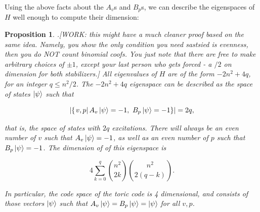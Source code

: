 \documentclass{article}
\newtheorem{proposition}{Proposition}[section]
\theoremstyle{definition}
\numberwithin{figure}{section}
\begin{document}
Using the above facts about the $A_v$s and $B_p$s, we can describe the eigenspaces of $H$ well enough to compute their dimension:

\begin{proposition}\label{eigenspaces} .[WORK: this might have a much cleaner proof based on the same idea. Namely, you show the only condition you need sastsied is evenness, then you do NOT count binomial coofs. You just note that there are free to make arbitrary choices of $\pm 1$, except your last person who gets forced - a $/2$ on dimension for both stabilizers.] All eigenvalues of $H$ are of the form $-2n^2+4q$, for an integer $q\leq n^2/2$. The $-2n^2+4q$ eigenspace can be described as the space of states $\left|\psi\right>$ such that

$$\left|\left\{\left. v,p\right| A_v\left|\psi\right> =-1,\,\, B_p\left|\psi\right>=-1\right\}\right|=2q,$$

that is, the space of states with $2q$ excitations. There will always be an even number of $v$ such that $A_v\left|\psi\right> =-1$, as well as an even number of $p$ such that $B_p\left|\psi\right>=-1$. The dimension of of this eigenspace is

$$4\sum_{k=0}^{q}{n^2 \choose 2k} {n^2 \choose 2(q-k)}.$$

In particular, the code space of the toric code is 4 dimensional, and consists of those vectors $\left|\psi\right>$ such that $A_v\left|\psi\right>=B_p\left|\psi\right>=\left|\psi\right>$ for all $v,p$.
\end{proposition}
\end{document}
